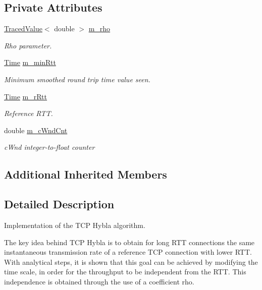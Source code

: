 \subsection*{Private Attributes}
\begin{DoxyCompactItemize}
\item 
\hyperlink{classns3_1_1TracedValue}{Traced\+Value}$<$ double $>$ \hyperlink{classns3_1_1TcpHybla_a89505ef8588ef3cbe7d19422cd8e1c78}{m\+\_\+rho}
\begin{DoxyCompactList}\small\item\em Rho parameter. \end{DoxyCompactList}\item 
\hyperlink{classns3_1_1Time}{Time} \hyperlink{classns3_1_1TcpHybla_aba2994395c9fa371e2a1cd84b713a157}{m\+\_\+min\+Rtt}
\begin{DoxyCompactList}\small\item\em Minimum smoothed round trip time value seen. \end{DoxyCompactList}\item 
\hyperlink{classns3_1_1Time}{Time} \hyperlink{classns3_1_1TcpHybla_a3bde103cdd139def963021b423853d78}{m\+\_\+r\+Rtt}
\begin{DoxyCompactList}\small\item\em Reference R\+TT. \end{DoxyCompactList}\item 
double \hyperlink{classns3_1_1TcpHybla_ac5ab21faceb85b6e6038419fd8392d54}{m\+\_\+c\+Wnd\+Cnt}
\begin{DoxyCompactList}\small\item\em c\+Wnd integer-\/to-\/float counter \end{DoxyCompactList}\end{DoxyCompactItemize}
\subsection*{Additional Inherited Members}


\subsection{Detailed Description}
Implementation of the T\+CP Hybla algorithm. 

The key idea behind T\+CP Hybla is to obtain for long R\+TT connections the same instantaneous transmission rate of a reference T\+CP connection with lower R\+TT. With analytical steps, it is shown that this goal can be achieved by modifying the time scale, in order for the throughput to be independent from the R\+TT. This independence is obtained through the use of a coefficient rho.

